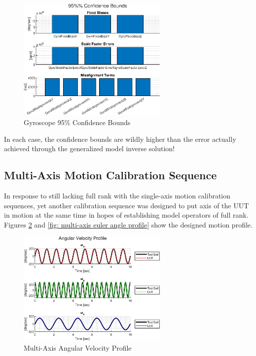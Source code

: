 \begin{figure}[h] 
	\centering
	\includegraphics[width=0.65\textwidth]{./images/SAM_gyro_model_95_confidence_bounds.eps}
	\caption{Gyroscope 95\% Confidence Bounds}
	\label{fig: single-axis gyro 95 confidence bounds}
\end{figure}
\FloatBarrier

In each case, the confidence bounds are wildly higher than the error actually achieved through the generalized model inverse solution!

















\subsection{Multi-Axis Motion Calibration Sequence}

In response to still lacking full rank with the single-axis motion calibration sequences, yet another calibration sequence was designed to put axis of the UUT in motion at the same time in hopes of establishing model operators of full rank. Figures \ref{fig: multi-axis angular velocity profile} and \ref{fig: multi-axis euler angle profile} show the designed motion profile.

\begin{figure}[h] 
	\centering
	\includegraphics[width=0.65\textwidth]{./images/MAM_angular_velocity_profile.eps}
	\caption{Multi-Axis Angular Velocity Profile}
	\label{fig: multi-axis angular velocity profile}
\end{figure}
\FloatBarrier

